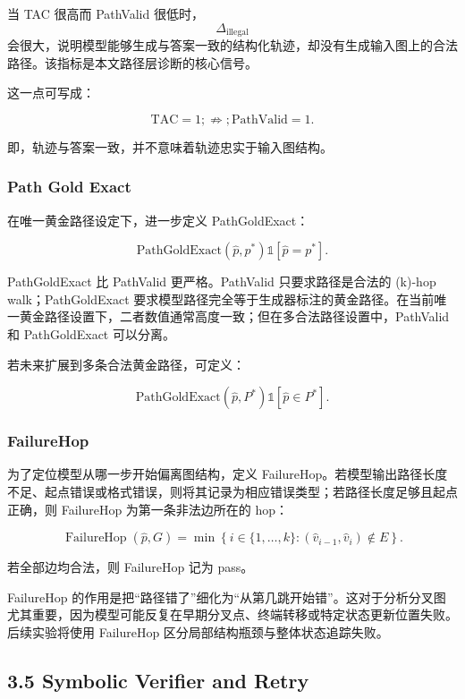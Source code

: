 \documentclass[
  11pt,
]{article}
\begin{document}
当 TAC 很高而 PathValid 很低时，\[\Delta_{\text{illegal}}\]
会很大，说明模型能够生成与答案一致的结构化轨迹，却没有生成输入图上的合法路径。该指标是本文路径层诊断的核心信号。

这一点可写成：

\[
\mathrm{TAC}=1  
;\not\Rightarrow;  
\mathrm{PathValid}=1.  
\]

即，轨迹与答案一致，并不意味着轨迹忠实于输入图结构。

\subsubsection{Path Gold Exact}\label{path-gold-exact}

在唯一黄金路径设定下，进一步定义 PathGoldExact：

\[
\mathrm{PathGoldExact}(\hat{p},p^*)
\mathbb{1}  
\left[  
\hat{p}=p^*  
\right].  
\]

PathGoldExact 比 PathValid 更严格。PathValid 只要求路径是合法的 (k)-hop
walk；PathGoldExact
要求模型路径完全等于生成器标注的黄金路径。在当前唯一黄金路径设置下，二者数值通常高度一致；但在多合法路径设置中，PathValid
和 PathGoldExact 可以分离。

若未来扩展到多条合法黄金路径，可定义：

\[
\mathrm{PathGoldExact}(\hat{p},P^*)
\mathbb{1}  
\left[  
\hat{p}\in P^*  
\right].  
\]

\subsubsection{FailureHop}\label{failurehop}

为了定位模型从哪一步开始偏离图结构，定义
FailureHop。若模型输出路径长度不足、起点错误或格式错误，则将其记录为相应错误类型；若路径长度足够且起点正确，则
FailureHop 为第一条非法边所在的 hop：

\[
\operatorname{FailureHop}(\hat{p}, G)
=
\min
\left\{
i \in \{1,\dots,k\}
:
(\hat{v}_{i-1}, \hat{v}_i) \notin E
\right\}.
\]

若全部边均合法，则 FailureHop 记为 pass。

FailureHop
的作用是把``路径错了''细化为``从第几跳开始错''。这对于分析分叉图尤其重要，因为模型可能反复在早期分叉点、终端转移或特定状态更新位置失败。后续实验将使用
FailureHop 区分局部结构瓶颈与整体状态追踪失败。

\subsection{3.5 Symbolic Verifier and
Retry}\label{symbolic-verifier-and-retry}
\end{document}

